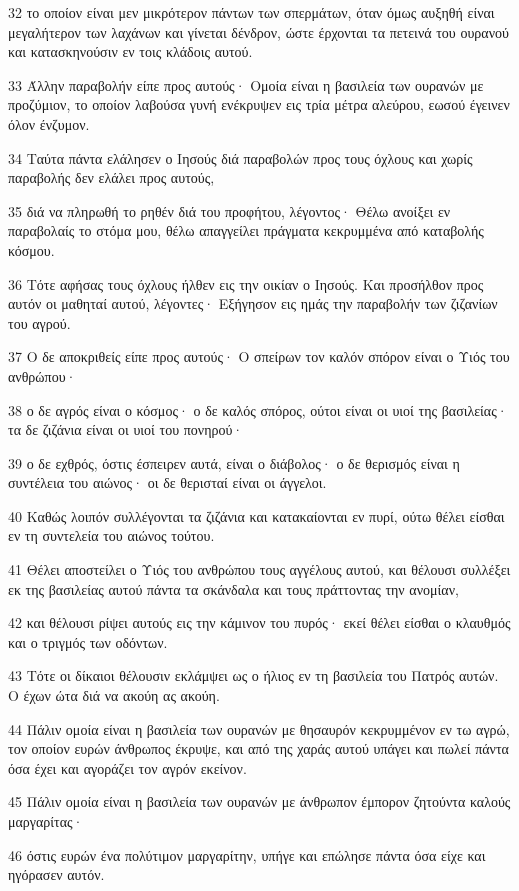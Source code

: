 \par 32 το οποίον είναι μεν μικρότερον πάντων των σπερμάτων, όταν όμως αυξηθή είναι μεγαλήτερον των λαχάνων και γίνεται δένδρον, ώστε έρχονται τα πετεινά του ουρανού και κατασκηνούσιν εν τοις κλάδοις αυτού.
\par 33 Άλλην παραβολήν είπε προς αυτούς· Ομοία είναι η βασιλεία των ουρανών με προζύμιον, το οποίον λαβούσα γυνή ενέκρυψεν εις τρία μέτρα αλεύρου, εωσού έγεινεν όλον ένζυμον.
\par 34 Ταύτα πάντα ελάλησεν ο Ιησούς διά παραβολών προς τους όχλους και χωρίς παραβολής δεν ελάλει προς αυτούς,
\par 35 διά να πληρωθή το ρηθέν διά του προφήτου, λέγοντος· Θέλω ανοίξει εν παραβολαίς το στόμα μου, θέλω απαγγείλει πράγματα κεκρυμμένα από καταβολής κόσμου.
\par 36 Τότε αφήσας τους όχλους ήλθεν εις την οικίαν ο Ιησούς. Και προσήλθον προς αυτόν οι μαθηταί αυτού, λέγοντες· Εξήγησον εις ημάς την παραβολήν των ζιζανίων του αγρού.
\par 37 Ο δε αποκριθείς είπε προς αυτούς· Ο σπείρων τον καλόν σπόρον είναι ο Υιός του ανθρώπου·
\par 38 ο δε αγρός είναι ο κόσμος· ο δε καλός σπόρος, ούτοι είναι οι υιοί της βασιλείας· τα δε ζιζάνια είναι οι υιοί του πονηρού·
\par 39 ο δε εχθρός, όστις έσπειρεν αυτά, είναι ο διάβολος· ο δε θερισμός είναι η συντέλεια του αιώνος· οι δε θερισταί είναι οι άγγελοι.
\par 40 Καθώς λοιπόν συλλέγονται τα ζιζάνια και κατακαίονται εν πυρί, ούτω θέλει είσθαι εν τη συντελεία του αιώνος τούτου.
\par 41 Θέλει αποστείλει ο Υιός του ανθρώπου τους αγγέλους αυτού, και θέλουσι συλλέξει εκ της βασιλείας αυτού πάντα τα σκάνδαλα και τους πράττοντας την ανομίαν,
\par 42 και θέλουσι ρίψει αυτούς εις την κάμινον του πυρός· εκεί θέλει είσθαι ο κλαυθμός και ο τριγμός των οδόντων.
\par 43 Τότε οι δίκαιοι θέλουσιν εκλάμψει ως ο ήλιος εν τη βασιλεία του Πατρός αυτών. Ο έχων ώτα διά να ακούη ας ακούη.
\par 44 Πάλιν ομοία είναι η βασιλεία των ουρανών με θησαυρόν κεκρυμμένον εν τω αγρώ, τον οποίον ευρών άνθρωπος έκρυψε, και από της χαράς αυτού υπάγει και πωλεί πάντα όσα έχει και αγοράζει τον αγρόν εκείνον.
\par 45 Πάλιν ομοία είναι η βασιλεία των ουρανών με άνθρωπον έμπορον ζητούντα καλούς μαργαρίτας·
\par 46 όστις ευρών ένα πολύτιμον μαργαρίτην, υπήγε και επώλησε πάντα όσα είχε και ηγόρασεν αυτόν.
